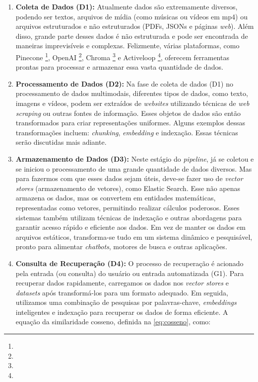 \documentclass[a4paper, 12pt]{article}
\begin{document}
    \begin{enumerate}
        \item \textbf{Coleta de Dados (D1):} Atualmente dados são extremamente diversos, podendo ser textos, arquivos de mídia (como músicas ou vídeos em mp4) ou arquivos estruturados e não estruturados (PDFs, JSONs e páginas \textit{web}). Além disso, grande parte desses dados é não estruturada e pode ser encontrada de maneiras imprevisíveis e complexas. Felizmente, várias plataformas, como Pinecone \footnote{}, OpenAI \footnote{}, Chroma \footnote{} e Activeloop \footnote{}, oferecem ferramentas prontas para processar e armazenar essa vasta quantidade de dados.
        \item \textbf{Processamento de Dados (D2):} Na fase de coleta de dados (D1) no processamento de dados multimodais, diferentes tipos de dados, como texto, imagens e vídeos, podem ser extraídos de \textit{websites} utilizando técnicas de \textit{web scraping} ou outras fontes de informação. Esses objetos de dados são então transformados para criar representações uniformes. Alguns exemplos dessas transformações incluem: \textit{chunking}, \textit{embedding} e indexação. Essas técnicas serão discutidas mais adiante.
        \item \textbf{Armazenamento de Dados (D3):} Neste estágio do \textit{pipeline}, já se coletou e se iniciou o processamento de uma grande quantidade de dados diversos. Mas para fazermos com que esses dados sejam úteis, deve-se fazer uso de \textit{vector stores} (armazenamento de vetores), como Elastic Search. Esse não apenas armazena os dados, mas os convertem em entidades matemáticas, representadas como vetores, permitindo realizar cálculos poderosos. Esses sistemas também utilizam técnicas de indexação e outras abordagens para garantir acesso rápido e eficiente aos dados. Em vez de manter os dados em arquivos estáticos, transforma-se tudo em um sistema dinâmico e pesquisável, pronto para alimentar \textit{chatbots}, motores de busca e outras aplicações.
        \item \textbf{Consulta de Recuperação (D4):} \label{sec:recovery} O processo de recuperação é acionado pela entrada (ou consulta) do usuário ou entrada automatizada (G1). Para recuperar dados rapidamente, carregamos os dados nos \textit{vector stores} e \textit{datasets} após transformá-los para um formato adequado. Em seguida, utilizamos uma combinação de pesquisas por palavras-chave, \textit{embeddings} inteligentes e indexação para recuperar os dados de forma eficiente.
        A equação da similaridade cosseno, definida na \autoref{eq:cosseno}, como: 
        

\end{enumerate}
\end{document}
